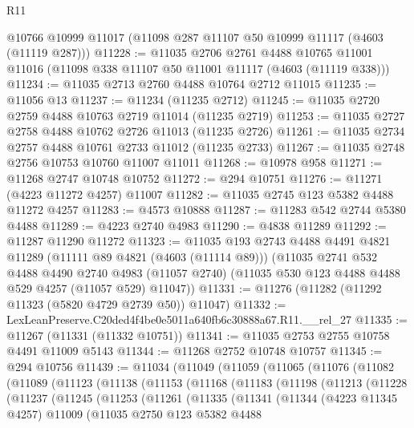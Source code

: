 \begin{lexlean}{R11}
\begin{coremodule}
    @10766
    @10999
    @11017
    (@11098 @287 @11107 @50 @10999 @11117 (@4603 (@11119 @287)))
@11228 := @11035
    @2706
    @2761
    @4488
    @10765
    @11001
    @11016
    (@11098 @338 @11107 @50 @11001 @11117 (@4603 (@11119 @338)))
@11234 := @11035 @2713 @2760 @4488 @10764 @2712 @11015
@11235 := @11056 @13
@11237 := @11234 (@11235 @2712)
@11245 := @11035 @2720 @2759 @4488 @10763 @2719 @11014 (@11235 @2719)
@11253 := @11035 @2727 @2758 @4488 @10762 @2726 @11013 (@11235 @2726)
@11261 := @11035 @2734 @2757 @4488 @10761 @2733 @11012 (@11235 @2733)
@11267 := @11035 @2748 @2756 @10753 @10760 @11007 @11011
@11268 := @10978 @958
@11271 := @11268 @2747 @10748 @10752
@11272 := @294 @10751
@11276 := @11271 (@4223 @11272 @4257) @11007
@11282 := @11035 @2745 @123 @5382 @4488 @11272 @4257
@11283 := @4573 @10888
@11287 := @11283 @542 @2744 @5380 @4488
@11289 := @4223 @2740 @4983
@11290 := @4838 @11289
@11292 := @11287 @11290 @11272
@11323 := @11035
    @193
    @2743
    @4488
    @4491
    @4821
    @11289
    (@11111 @89 @4821 (@4603 (@11114 @89)))
    (@11035
      @2741
      @532
      @4488
      @4490
      @2740
      @4983
      (@11057 @2740)
      (@11035 @530 @123 @4488 @4488 @529 @4257 (@11057 @529) @11047))
@11331 := @11276 (@11282 (@11292 @11323 (@5820 @4729 @2739 @50)) @11047)
@11332 := LexLeanPreserve.C20ded4f4be0e5011a640fb6c30888a67.R11.__rel_27
@11335 := @11267 (@11331 (@11332 @10751))
@11341 := @11035 @2753 @2755 @10758 @4491 @11009 @5143
@11344 := @11268 @2752 @10748 @10757
@11345 := @294 @10756
@11439 := @11034
    (@11049
      (@11059
        (@11065
          (@11076
            (@11082
              (@11089
                (@11123
                  (@11138
                    (@11153
                      (@11168
                        (@11183
                          (@11198
                            (@11213
                              (@11228
                                (@11237
                                  (@11245
                                    (@11253
                                      (@11261
                                        (@11335
                                          (@11341
                                            (@11344
                                              (@4223 @11345 @4257)
                                              @11009
                                              (@11035
                                                @2750
                                                @123
                                                @5382
                                                @4488

\end{coremodule}
\end{lexlean}
